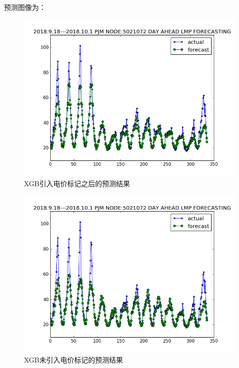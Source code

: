 \documentclass[UTF-8, 10pt]{ctexart}
\begin{document}
                \indent{}预测图像为：\\
                \begin{figure}[H]                                        %
                    \centering                                                      %
                    \includegraphics[width = .8\textwidth]{XGB_SPIKE.png}            %
                    \caption{XGB引入电价标记之后的预测结果}\label{1}                               %
                    \end{figure}

                \begin{figure}[H]                                        %
                    \centering                                                      %
                    \includegraphics[width = .8\textwidth]{XGB.png}            %
                    \caption{XGB未引入电价标记的预测结果}\label{1}                               %
                    \end{figure}
\end{document}

